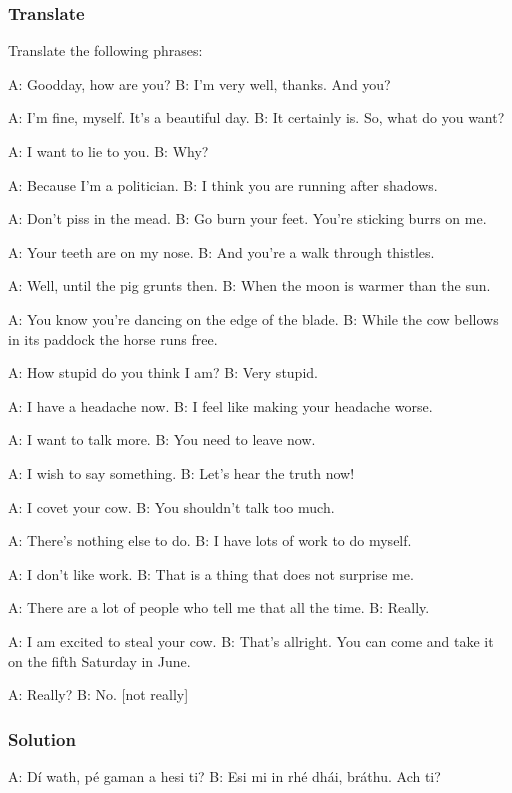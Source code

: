 \subsubsection{Translate}

Translate the following phrases:

A: Goodday, how are you?
B: I'm very well, thanks. And you?

A: I'm fine, myself. It's a beautiful day.
B: It certainly is. So, what do you want?

A: I want to lie to you.
B: Why?

A: Because I'm a politician.
B: I think you are running after shadows.

A: Don't piss in the mead.
B: Go burn your feet. You're sticking burrs on me.

A: Your teeth are on my nose.
B: And you're a walk through thistles.

A: Well, until the pig grunts then.
B: When the moon is warmer than the sun.

A: You know you're dancing on the edge of the blade.
B: While the cow bellows in its paddock the horse runs free.

A: How stupid do you think I am?
B: Very stupid.

A: I have a headache now.
B: I feel like making your headache worse.

A: I want to talk more.
B: You need to leave now.

A: I wish to say something.
B: Let's hear the truth now!

A: I covet your cow.
B: You shouldn't talk too much.

A: There's nothing else to do.
B: I have lots of work to do myself.

A: I don't like work.
B: That is a thing that does not surprise me.

A: There are a lot of people who tell me that all the time.
B: Really.

A: I am excited to steal your cow.
B: That's allright. You can come and take it on the fifth Saturday in June.

A: Really?
B: No. [not really]

\newpage
\subsubsection{Solution}

A: D\'{i} wath, p\'{e} gaman a hesi ti?
B: Esi mi in rh\'{e} dh\'{a}i, br\'{a}thu. Ach ti?

